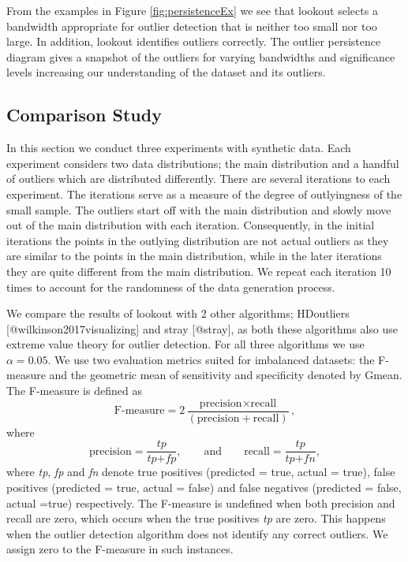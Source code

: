 \documentclass[
]{article}
\begin{document}
From the examples in Figure \ref{fig:persistenceEx} we see that lookout
selects a bandwidth appropriate for outlier detection that is neither
too small nor too large. In addition, lookout identifies outliers
correctly. The outlier persistence diagram gives a snapshot of the
outliers for varying bandwidths and significance levels increasing our
understanding of the dataset and its outliers.

\hypertarget{sec:SyntheticComparison}{%
\subsection{Comparison Study}\label{sec:SyntheticComparison}}

In this section we conduct three experiments with synthetic data. Each
experiment considers two data distributions; the main distribution and a
handful of outliers which are distributed differently. There are several
iterations to each experiment. The iterations serve as a measure of the
degree of outlyingness of the small sample. The outliers start off with
the main distribution and slowly move out of the main distribution with
each iteration. Consequently, in the initial iterations the points in
the outlying distribution are not actual outliers as they are similar to
the points in the main distribution, while in the later iterations they
are quite different from the main distribution. We repeat each iteration
10 times to account for the randomness of the data generation process.

We compare the results of lookout with 2 other algorithms; HDoutliers
{[}@wilkinson2017visualizing{]} and stray {[}@stray{]}, as both these
algorithms also use extreme value theory for outlier detection. For all
three algorithms we use \(\alpha = 0.05\). We use two evaluation metrics
suited for imbalanced datasets: the F-measure and the geometric mean of
sensitivity and specificity denoted by Gmean. The F-measure is defined
as \begin{equation}\label{eq:fmeasure}
    \text{F-measure} = 2\frac{\text{precision} \times \text{recall}}{\left( \text{precision} + \text{recall} \right) }  ,
\end{equation} where \begin{equation}\label{eq:pr}
    \text{precision} = \frac{ \textit{tp} }{\textit{tp} + \textit{fp}}  , \qquad \text{and} \qquad \text{recall} = \frac{\textit{tp}}{\textit{tp} + \textit{fn}}  ,
\end{equation} where \emph{tp}, \emph{fp} and \emph{fn} denote true
positives (predicted = true, actual = true), false positives (predicted
= true, actual = false) and false negatives (predicted = false, actual
=true) respectively. The F-measure is undefined when both precision and
recall are zero, which occurs when the true positives \emph{tp} are
zero. This happens when the outlier detection algorithm does not
identify any correct outliers. We assign zero to the F-measure in such
instances.
\end{document}
